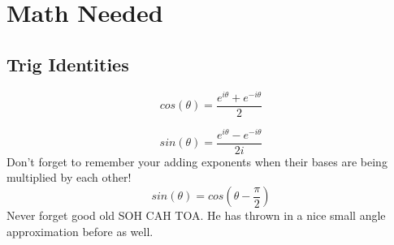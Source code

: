\documentclass{article}
\begin{document}



















\section{Math Needed}
\subsection{Trig Identities}
\begin{equation}
    cos(\theta)= \frac{e^{i \theta}+e^{-i \theta}}{2}
\end{equation}

\begin{equation}
    sin(\theta)= \frac{e^{i \theta}-e^{-i \theta}}{2i}
\end{equation}
Don't forget to remember your adding exponents when their bases are being multiplied by each other!
\begin{equation}
    sin(\theta)= cos(\theta - \frac{\pi}{2}) 
\end{equation}
Never forget good old SOH CAH TOA. 
He has thrown in a nice small angle approximation before as well. 
\end{document}
